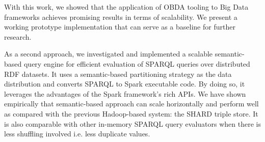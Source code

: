 With this work, we showed that the application of OBDA tooling to Big Data frameworks achieves promising results in terms of scalability. 
We present a working prototype implementation that can serve as a baseline for further research.

As a second approach, we investigated and implemented a scalable semantic-based query engine for efficient evaluation of SPARQL queries over distributed \gls{RDF} datasets. 
It uses a semantic-based partitioning strategy as the data distribution and converts \gls{SPARQL} to Spark executable code.
By doing so, it leverages the advantages of the Spark framework's rich APIs.
We have shown empirically that semantic-based approach can scale horizontally and perform well as compared with the previous Hadoop-based system: the SHARD triple store.
It is also comparable with other in-memory SPARQL query evaluators when there is less shuffling involved i.e. less duplicate values.
